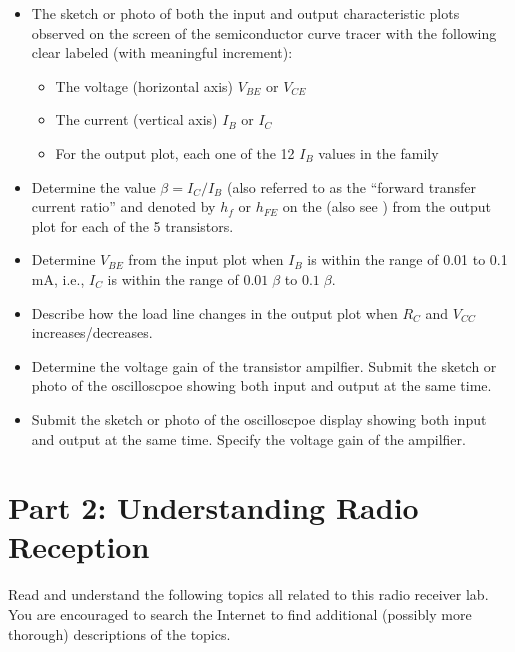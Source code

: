 \begin{itemize}
\item The sketch or photo of both the input and output characteristic plots 
  observed on the screen of the semiconductor curve tracer with the following
  clear labeled (with meaningful increment):
  \begin{itemize}
  \item The voltage (horizontal axis) $V_{BE}$ or $V_{CE}$
  \item The current (vertical axis) $I_B$ or $I_C$
  \item For the output plot, each one of the 12 $I_B$ values in the family
  \end{itemize}
\item Determine the value $\beta=I_C/I_B$ (also referred to as the 
  ``forward transfer current ratio'' and denoted by $h_f$ or $h_{FE}$ on
  the 
  (also see )
  from the output plot for each of the 5 transistors.
\item Determine $V_{BE}$ from the input plot when $I_B$ is within the range of
  0.01 to 0.1 mA, i.e., $I_C$ is within the range of $0.01\;\beta$ to $0.1\;\beta$.
\item Describe how the load line changes in the output plot when $R_C$ and $V_{CC}$
  increases/decreases.
\item Determine the voltage gain of the transistor ampilfier. Submit the sketch
  or photo of the oscilloscpoe showing both input and output at the same time.
\item Submit the sketch or photo of the oscilloscpoe display showing both input and output at the same time. Specify the voltage gain of the ampilfier.
\end{itemize}

\section{Part 2: Understanding Radio Reception}

Read and understand the following topics all related to this radio receiver lab. You 
are encouraged to search the Internet to find additional (possibly more thorough) 
descriptions of the topics.


